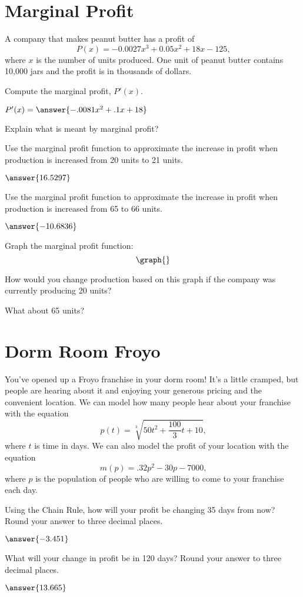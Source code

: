 \documentclass{ximera}
\begin{document}
\section{Marginal Profit}
A company that makes peanut butter has a profit of $$P(x)=-0.0027x^3+0.05x^2+18x-125\text{,}$$ where $x$ is the number of units produced. One unit of peanut butter contains 10,000 jars and the profit is in thousands of dollars.
\begin{question}
Compute the marginal profit, $P'(x)$.

$P'(x)=\answer{-.0081x^2+.1x+18}$

Explain what is meant by marginal profit?
\begin{freeResponse}
\end{freeResponse}

Use the marginal profit function to approximate the increase in profit when production is increased from 20 units to 21 units.

$\answer{16.5297}$

Use the marginal profit function to approximate the increase in profit when production is increased from 65 to 66 units.

$\answer{-10.6836}$

Graph the marginal profit function:
\[
\graph{}
\]

How would you change production based on this graph if the company was currently producing 20 units?

\begin{multipleChoice}
\end{multipleChoice}

What about 65 units?

\begin{multipleChoice}
\end{multipleChoice}
\end{question}
\setcounter{problem}{0}
\section{Dorm Room Froyo}
You've opened up a Froyo franchise in your dorm room! It's a little cramped, but people are hearing about it and enjoying your generous pricing and the convenient location. We can model how many people hear about your franchise with the equation $$p(t) = \sqrt[3]{50t^2+\dfrac{100}{3}t+10} \text{,}$$ where $t$ is time in days. We can also model the profit of your location with the equation $$m(p) = .32p^2 - 30p - 7000 \text{,}$$ where $p$ is the population of people who are willing to come to your franchise each day.
\begin{question}
Using the Chain Rule, how will your profit be changing 35 days from now? Round your answer to three decimal places.

$\answer{-3.451}$

What will your change in profit be in 120 days? Round your answer to three decimal places.

$\answer{13.665}$
\end{question}
\end{document}
